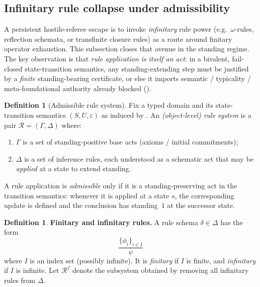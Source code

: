 \documentclass[11pt]{article}
\theoremstyle{definition}
\newtheorem{definition}[theorem]{Definition}
\begin{document}
\subsection{Infinitary rule collapse under admissibility}
\label{sec:infinitary-collapse}

A persistent hostile-referee escape is to invoke \emph{infinitary} rule power (e.g.\ $\omega$-rules,
reflection schemata, or transfinite closure rules) as a route around finitary operator exhaustion.
This subsection closes that avenue in the standing regime.
The key observation is that \emph{rule application is itself an act}: in a bivalent, fail-closed
state-transition semantics, any standing-extending step must be justified by a \emph{finite}
standing-bearing certificate, or else it imports semantic / typicality / meta-foundational authority
already blocked ().

\begin{definition}[Admissible rule system]
\label{def:admissible-rule-system}
Fix a typed domain and its state-transition semantics $(S,U,\varepsilon)$ as induced by
.
An \emph{(object-level) rule system} is a pair $\mathcal R=(\Gamma,\Delta)$ where:
\begin{enumerate}[label=(\alph*), leftmargin=2.0em]
\item $\Gamma$ is a set of standing-positive base acts (axioms / initial commitments);
\item $\Delta$ is a set of inference rules, each understood as a schematic act that may be
\emph{applied} at a state to extend standing.
\end{enumerate}
A rule application is \emph{admissible} only if it is a standing-preserving act in the transition
semantics: whenever it is applied at a state $s$, the corresponding update is defined and the
conclusion has standing~$1$ at the successor state.
\end{definition}

\begin{definition}
\textbf{Finitary and infinitary rules.} A rule schema $\delta\in\Delta$ has the form
\[
\frac{\{\phi_i\}_{i\in I}}{\psi}
\]
where $I$ is an index set (possibly infinite).
It is \emph{finitary} if $I$ is finite, and \emph{infinitary} if $I$ is infinite.
Let $\mathcal R^f$ denote the subsystem obtained by removing all infinitary rules from $\Delta$.
\end{definition}
\end{document}
